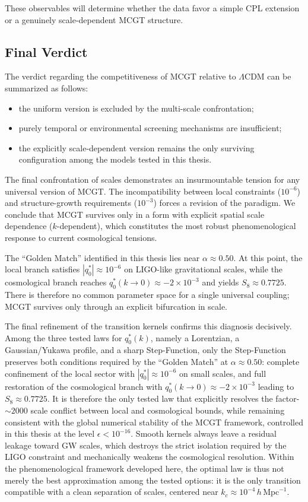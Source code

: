 These observables will determine whether the data favor a simple CPL extension or a genuinely scale-dependent MCGT structure.

\subsection{Final Verdict}
The verdict regarding the competitiveness of MCGT relative to $\Lambda$CDM can be summarized as follows:
\begin{itemize}
    \item the uniform version is excluded by the multi-scale confrontation;
    \item purely temporal or environmental screening mechanisms are insufficient;
    \item the explicitly scale-dependent version remains the only surviving configuration among the models tested in this thesis.
\end{itemize}

The final confrontation of scales demonstrates an insurmountable tension for any universal version of MCGT. The incompatibility between local constraints ($10^{-6}$) and structure-growth requirements ($10^{-3}$) forces a revision of the paradigm. We conclude that MCGT survives only in a form with explicit spatial scale dependence ($k$-dependent), which constitutes the most robust phenomenological response to current cosmological tensions.

The ``Golden Match'' identified in this thesis lies near $\alpha \approx 0.50$. At this point, the local branch satisfies $|q_0^*| \approx 10^{-6}$ on LIGO-like gravitational scales, while the cosmological branch reaches $q_0^*(k \rightarrow 0) \approx -2 \times 10^{-3}$ and yields $S_8 \approx 0.7725$. There is therefore no common parameter space for a single universal coupling; MCGT survives only through an explicit bifurcation in scale.

The final refinement of the transition kernels confirms this diagnosis decisively. Among the three tested laws for $q_0^*(k)$, namely a Lorentzian, a Gaussian/Yukawa profile, and a sharp Step-Function, only the Step-Function preserves both conditions required by the ``Golden Match'' at $\alpha \approx 0.50$: complete confinement of the local sector with $|q_0^*| \approx 10^{-6}$ on small scales, and full restoration of the cosmological branch with $q_0^*(k \rightarrow 0) \approx -2 \times 10^{-3}$ leading to $S_8 \approx 0.7725$. It is therefore the only tested law that explicitly resolves the factor-$\sim 2000$ scale conflict between local and cosmological bounds, while remaining consistent with the global numerical stability of the MCGT framework, controlled in this thesis at the level $\epsilon < 10^{-16}$. Smooth kernels always leave a residual leakage toward GW scales, which destroys the strict isolation required by the LIGO constraint and mechanically weakens the cosmological resolution. Within the phenomenological framework developed here, the optimal law is thus not merely the best approximation among the tested options: it is the only transition compatible with a clean separation of scales, centered near $k_c \approx 10^{-4}\,h\,\mathrm{Mpc}^{-1}$.

